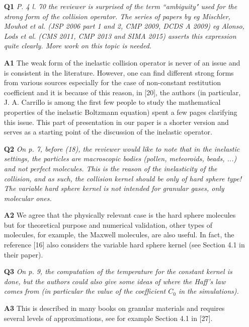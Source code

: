 \documentclass[11pt]{article}
\begin{document}
\begin{itemize}

\item[{\bf Q1}] {\it P. 4 l. 70 the reviewer is surprised of the term ``ambiguity" used for the strong form of the collision operator. The series of papers by eg Mischler, Mouhot et al. (JSP 2006 part 1 and 2, CMP 2009, DCDS A 2009) eg Alonso, Lods et al. (CMS 2011, CMP 2013 and SIMA 2015) asserts this expression quite clearly. More work on this topic is needed.}

\item[{\bf A1}] The weak form of the inelastic collision operator is never of an issue and is consistent in the literature. However, one can find different strong forms from various sources especially for the case of non-constant restitution coefficient and it is because of this reason, in [20], the authors (in particular, J. A. Carrillo is among the first few people to study the mathematical properties of the inelastic Boltzmann equation) spent a few pages clarifying this issue. This part of presentation in our paper is a shorter version and serves as a starting point of the discussion of the inelastic operator.

\item[{\bf Q2}] {\it On p. 7, before (18), the reviewer would like to note that in the inelastic settings, the particles are macroscopic bodies (pollen, meteoroids, beads, ...) and not perfect molecules. This is the reason of the inelasticity of the collision, and as such, the collision kernel should be only of hard sphere type! The variable hard sphere kernel is not intended for granular gases, only molecular ones.}

\item[{\bf A2}] We agree that the physically relevant case is the hard sphere molecules but for theoretical purpose and numerical validation, other types of molecules, for example, the Maxwell molecules, are also useful. In fact, the reference [16] also considers the variable hard sphere kernel (see Section 4.1 in their paper).

\item[{\bf Q3}] {\it On p. 9, the computation of the temperature for the constant kernel is done, but the authors could also give some ideas of where the Haff's law comes from (in particular the value of the coefficient $C_0$ in the simulations).
}

\item[{\bf A3}] This is described in many books on granular materials and requires several levels of approximations, see for example Section 4.1 in [27].



\end{itemize}
\end{document}
